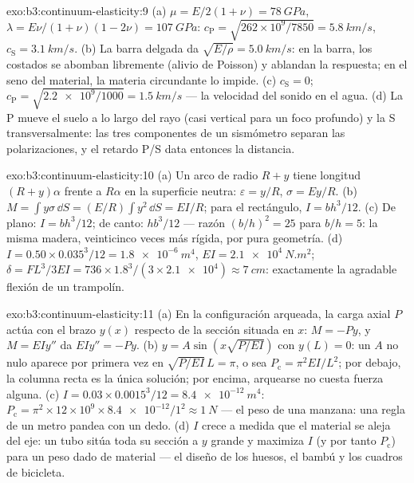 \begin{solution}{exo:b3:continuum-elasticity:9}
(a) $\mu = E/2(1+\nu) = \qty{78}{GPa}$, $\lambda = E\nu/(1+\nu)(1-2\nu)
= \qty{107}{GPa}$: $c_{\text{P}} = \sqrt{262\times10^9/7850} =
\qty{5.8}{km/s}$, $c_{\text{S}} = \qty{3.1}{km/s}$. (b) La barra delgada
da $\sqrt{E/\rho} = \qty{5.0}{km/s}$: en la barra, los costados se abomban
libremente (alivio de Poisson) y ablandan la respuesta; en el seno del
material, la materia circundante lo impide. (c) $c_{\text{S}} = 0$;
$c_{\text{P}} = \sqrt{\num{2.2e9}/1000} = \qty{1.5}{km/s}$ --- la
velocidad del sonido en el agua. (d) La P mueve el suelo a lo largo del rayo
(casi vertical para un foco profundo) y la S transversalmente: las tres
componentes de un sismómetro separan las polarizaciones, y el retardo P/S
data entonces la distancia.
\end{solution}

\begin{solution}{exo:b3:continuum-elasticity:10}
(a) Un arco de radio $R + y$ tiene longitud $(R + y)\alpha$ frente a
$R\alpha$ en la superficie neutra: $\varepsilon = y/R$, $\sigma =
Ey/R$. (b) $M = \int y\sigma\,\dd S = (E/R)\int y^2\,\dd S = EI/R$;
para el rectángulo, $I = bh^3/12$. (c) De plano: $I = bh^3/12$; de canto:
$hb^3/12$ --- razón $(b/h)^2 = 25$ para $b/h = 5$: la misma madera,
veinticinco veces más rígida, por pura geometría. (d) $I = 0.50 \times
0.035^3/12 = \qty{1.8e-6}{m^4}$, $EI = \qty{2.1e4}{N.m^2}$; $\delta =
FL^3/3EI = 736 \times 1.8^3/(3 \times \num{2.1e4}) \approx
\qty{7}{cm}$: exactamente la agradable flexión de un trampolín.
\end{solution}

\begin{solution}{exo:b3:continuum-elasticity:11}
(a) En la configuración arqueada, la carga axial $P$ actúa con el brazo
$y(x)$ respecto de la sección situada en $x$: $M = -Py$, y $M = EIy''$ da
$EIy'' = -Py$. (b) $y = A\sin(x\sqrt{P/EI})$ con $y(L) = 0$: un
$A$ no nulo aparece por primera vez en $\sqrt{P/EI}\,L = \pi$, o sea $P_{\text{c}} =
\pi^2EI/L^2$; por debajo, la columna recta es la única solución; por
encima, arquearse no cuesta fuerza alguna. (c) $I = 0.03 \times 0.0015^3/12 =
\qty{8.4e-12}{m^4}$: $P_{\text{c}} = \pi^2 \times 12\times10^9 \times
\num{8.4e-12}/1^2 \approx \qty{1}{N}$ --- el peso de
una manzana: una regla de un metro pandea con un dedo. (d) $I$ crece a
medida que el material se aleja del eje: un tubo sitúa toda su sección a $y$
grande y maximiza $I$ (y por tanto $P_{\text{c}}$) para un peso dado de
material --- el diseño de los huesos, el bambú y los cuadros de bicicleta.
\end{solution}

